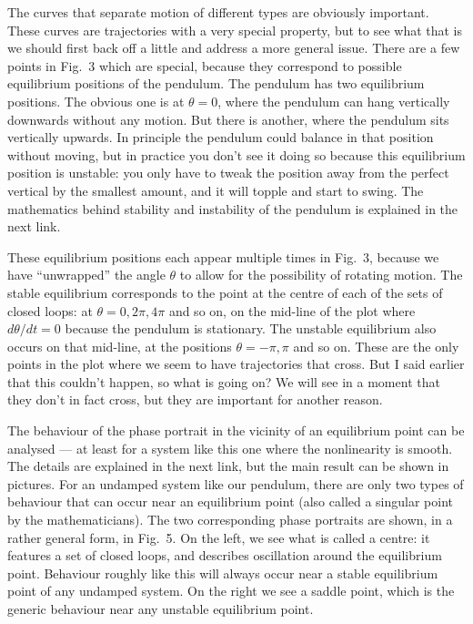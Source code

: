   The curves that separate motion of different types are obviously important. 
  These curves are trajectories with a very special property, but to see what 
  that is we should first back off a little and address a more general issue. 
  There are a few points in Fig.\ 3 which are special, because they correspond 
  to possible equilibrium positions of the pendulum. The pendulum has two 
  equilibrium positions. The obvious one is at $\theta=0$, where the pendulum 
  can hang vertically downwards without any motion. But there is another, where 
  the pendulum sits vertically upwards. In principle the pendulum could balance 
  in that position without moving, but in practice you don’t see it doing so 
  because this equilibrium position is unstable: you only have to tweak the 
  position away from the perfect vertical by the smallest amount, and it will 
  topple and start to swing. The mathematics behind stability and instability 
  of the pendulum is explained in the next link. 

  These equilibrium positions each appear multiple times in Fig.\ 3, because we 
  have “unwrapped” the angle $\theta$ to allow for the possibility of rotating 
  motion. The stable equilibrium corresponds to the point at the centre of each 
  of the sets of closed loops: at $\theta=0,2\pi,4\pi$ and so on, on the 
  mid-line of the plot where $d\theta/dt=0$ because the pendulum is stationary. 
  The unstable equilibrium also occurs on that mid-line, at the positions 
  $\theta=-\pi,\pi$ and so on. These are the only points in the plot where we 
  seem to have trajectories that cross. But I said earlier that this couldn’t 
  happen, so what is going on? We will see in a moment that they don’t in fact 
  cross, but they are important for another reason. 

  The behaviour of the phase portrait in the vicinity of an equilibrium point 
  can be analysed — at least for a system like this one where the nonlinearity 
  is smooth. The details are explained in the next link, but the main result 
  can be shown in pictures. For an undamped system like our pendulum, there are 
  only two types of behaviour that can occur near an equilibrium point (also 
  called a singular point by the mathematicians). The two corresponding phase 
  portraits are shown, in a rather general form, in Fig.\ 5. On the left, we 
  see what is called a centre: it features a set of closed loops, and describes 
  oscillation around the equilibrium point. Behaviour roughly like this will 
  always occur near a stable equilibrium point of any undamped system. On the 
  right we see a saddle point, which is the generic behaviour near any unstable 
  equilibrium point. 

